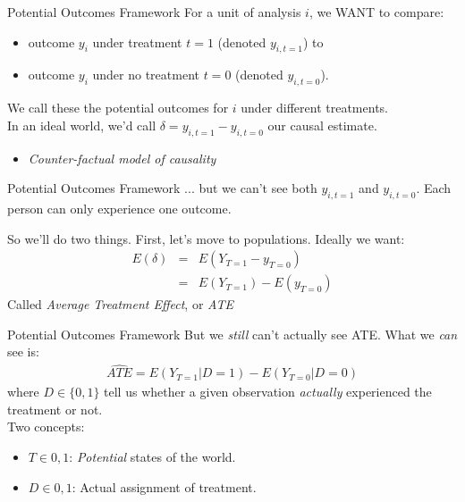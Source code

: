 \documentclass[11pt]{beamer}
\begin{document}
\begin{frame}[c]{Potential Outcomes Framework}
\pause For a unit of analysis $i$, we WANT to compare:
\begin{itemize}
  \item outcome $y_i$ under treatment $t=1$ (denoted $y_{i, t=1}$) to
  \item outcome $y_i$ under no treatment $t=0$ (denoted $y_{i, t=0}$).
\end{itemize}
\pause We call these the \alert{potential outcomes} for $i$ under different treatments.\\
\pause In an ideal world, we'd call \alert{$\delta = y_{i, t=1} - y_{i, t=0}$} our causal estimate.
\begin{itemize}
  \pause \item \emph{Counter-factual model of causality}
\end{itemize}
\end{frame}

\begin{frame}[c]{Potential Outcomes Framework}
... but we can't see both $y_{i, t=1}$ and $y_{i, t=0}$. Each person can only experience one outcome.

So we'll do two things. First, let's move to populations. Ideally we want:
\begin{eqnarray}
  E(\delta) &=& E(Y_{T=1} - y_{T=0}) \nonumber \\
             &=& E(Y_{T=1}) - E(y_{T=0}) \nonumber
\end{eqnarray}
\pause Called \emph{Average Treatment Effect}, or \emph{ATE}
\end{frame}

\begin{frame}[c]{Potential Outcomes Framework}
But we \emph{still} can't actually see ATE. What we \emph{can} see is:
\begin{eqnarray}
\widehat{ATE} = E(Y_{T=1}|D=1) - E(Y_{T=0}|D=0) \nonumber
\end{eqnarray}
where $D\in\{0,1\}$ tell us whether a given observation \emph{actually} experienced the treatment or not.\\
\pause
\vspace{0.1cm}
Two concepts:
\begin{itemize}
  \item $T\in{0,1}$: \emph{Potential} states of the world.
  \item $D\in{0,1}$: Actual assignment of treatment.
\end{itemize}
\end{frame}
\end{document}
